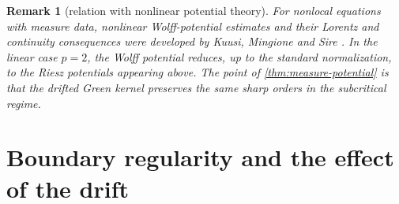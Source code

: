 \documentclass[10pt,a4paper]{amsart}
\numberwithin{equation}{section}
\newtheorem{remark}[theorem]{Remark}
\begin{document}
\begin{remark}[relation with nonlinear potential theory]
For nonlocal equations with measure data, nonlinear Wolff-potential
estimates and their Lorentz and continuity consequences were developed by
Kuusi, Mingione and Sire \cite{KuusiMingioneSire2015}.  In the linear case
$p=2$, the Wolff potential reduces, up to the standard normalization, to the
Riesz potentials appearing above.  The point of
\cref{thm:measure-potential} is that the drifted Green kernel preserves the
same sharp orders in the subcritical regime.
\end{remark}

\section{Boundary regularity and the effect of the drift}
\label{sec:boundary}
\end{document}
